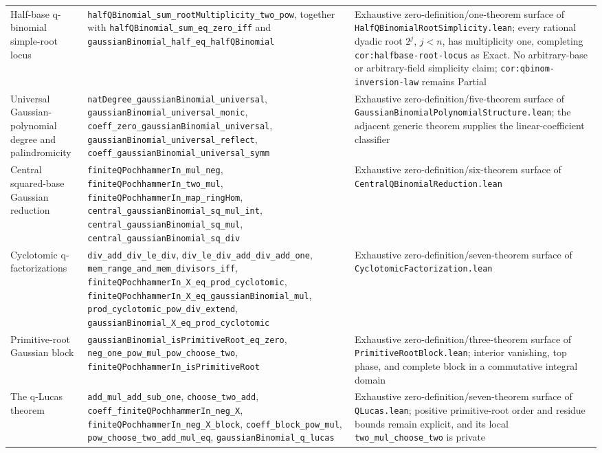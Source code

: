 \documentclass[11pt,oneside]{article}
\theoremstyle{definition}
\theoremstyle{remark}
\begin{document}
\begin{longtable}{@{}>{\raggedright\arraybackslash}p{} >{\raggedright\arraybackslash}p{} >{\raggedright\arraybackslash}p{}@{}}
Half-base q-binomial simple-root locus & \nolinkurl{halfQBinomial_sum_rootMultiplicity_two_pow}, together with \nolinkurl{halfQBinomial_sum_eq_zero_iff} and \nolinkurl{gaussianBinomial_half_eq_halfQBinomial} & Exhaustive zero-definition/one-theorem surface of \nolinkurl{HalfQBinomialRootSimplicity.lean}; every rational dyadic root \(2^j\), \(j<n\), has multiplicity one, completing \nolinkurl{cor:halfbase-root-locus} as Exact.  No arbitrary-base or arbitrary-field simplicity claim; \nolinkurl{cor:qbinom-inversion-law} remains Partial \\
Universal Gaussian-polynomial degree and palindromicity & \nolinkurl{natDegree_gaussianBinomial_universal}, \nolinkurl{gaussianBinomial_universal_monic}, \nolinkurl{coeff_zero_gaussianBinomial_universal}, \nolinkurl{gaussianBinomial_universal_reflect}, \nolinkurl{coeff_gaussianBinomial_universal_symm} & Exhaustive zero-definition/five-theorem surface of \nolinkurl{GaussianBinomialPolynomialStructure.lean}; the adjacent generic theorem supplies the linear-coefficient classifier \\
Central squared-base Gaussian reduction & \nolinkurl{finiteQPochhammerIn_mul_neg}, \nolinkurl{finiteQPochhammerIn_two_mul}, \nolinkurl{finiteQPochhammerIn_map_ringHom}, \nolinkurl{central_gaussianBinomial_sq_mul_int}, \nolinkurl{central_gaussianBinomial_sq_mul}, \nolinkurl{central_gaussianBinomial_sq_div} & Exhaustive zero-definition/six-theorem surface of \nolinkurl{CentralQBinomialReduction.lean} \\
Cyclotomic q-factorizations & \nolinkurl{div_add_div_le_div}, \nolinkurl{div_le_div_add_div_add_one}, \nolinkurl{mem_range_and_mem_divisors_iff}, \nolinkurl{finiteQPochhammerIn_X_eq_prod_cyclotomic}, \nolinkurl{finiteQPochhammerIn_X_eq_gaussianBinomial_mul}, \nolinkurl{prod_cyclotomic_pow_div_extend}, \nolinkurl{gaussianBinomial_X_eq_prod_cyclotomic} & Exhaustive zero-definition/seven-theorem surface of \nolinkurl{CyclotomicFactorization.lean} \\
Primitive-root Gaussian block & \nolinkurl{gaussianBinomial_isPrimitiveRoot_eq_zero}, \nolinkurl{neg_one_pow_mul_pow_choose_two}, \nolinkurl{finiteQPochhammerIn_isPrimitiveRoot} & Exhaustive zero-definition/three-theorem surface of \nolinkurl{PrimitiveRootBlock.lean}; interior vanishing, top phase, and complete block in a commutative integral domain \\
The q-Lucas theorem & \nolinkurl{add_mul_add_sub_one}, \nolinkurl{choose_two_add}, \nolinkurl{coeff_finiteQPochhammerIn_neg_X}, \nolinkurl{finiteQPochhammerIn_neg_X_block}, \nolinkurl{coeff_block_pow_mul}, \nolinkurl{pow_choose_two_add_mul_eq}, \nolinkurl{gaussianBinomial_q_lucas} & Exhaustive zero-definition/seven-theorem surface of \nolinkurl{QLucas.lean}; positive primitive-root order and residue bounds remain explicit, and its local \nolinkurl{two_mul_choose_two} is private \\

\end{longtable}
\end{document}
